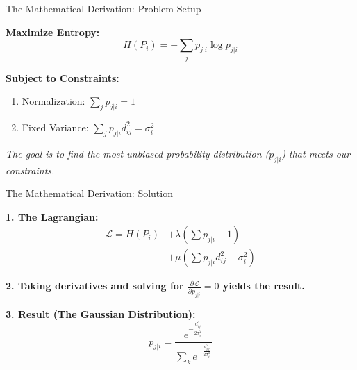 \documentclass[aspectratio=169]{beamer}
\begin{document}
\begin{frame}{The Mathematical Derivation: Problem Setup}
    \begin{tcolorbox}[colback=yellow!5, colframe=orange!40, title={\textbf{Optimization Problem}}]
    \textbf{Maximize Entropy:}
    \[H(P_i) = -\sum_j p_{j|i} \log p_{j|i}\]

    \textbf{Subject to Constraints:}
    \begin{enumerate}
    \item Normalization: $\sum_j p_{j|i} = 1$
    \item Fixed Variance: $\sum_j p_{j|i} d_{ij}^2 = \sigma_i^2$
    \end{enumerate}
    
    \vspace{2mm}
    \textit{The goal is to find the most unbiased probability distribution ($p_{j|i}$) that meets our constraints.}
    \end{tcolorbox}
\end{frame}


\begin{frame}{The Mathematical Derivation: Solution}
    \begin{tcolorbox}[colback=blue!5, colframe=blue!40, title={\textbf{Solution via Lagrange Multipliers}}]
    
    \textbf{1. The Lagrangian:}
    \begin{align*}
    \mathcal{L} = H(P_i) &+ \lambda \left(\sum p_{j|i} - 1\right) \\
                         &+ \mu \left(\sum p_{j|i}d_{ij}^2 - \sigma_i^2\right)
    \end{align*}
    
    \vspace{1mm}
    \textbf{2. Taking derivatives and solving for $\frac{\partial \mathcal{L}}{\partial p_{j|i}} = 0$ yields the result.}
    \vspace{1mm}
    
    \textbf{3. Result (The Gaussian Distribution):}
    \[
    p_{j|i} = \frac{e^{-\frac{d_{ij}^2}{2\sigma_i^2}}}{\sum_k e^{-\frac{d_{ik}^2}{2\sigma_i^2}}}
    \]
    
    \end{tcolorbox}
\end{frame}
\end{document}
